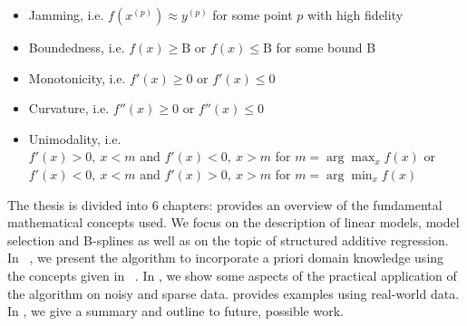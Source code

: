 \begin{itemize} \label{list:possible-constraints}
	\item Jamming, i.e. $f(x^{(p)}) \approx y^{(p)}$ for some point $p$ with high fidelity
	\item Boundedness, i.e. $f(x) \ge \mathrm{B}$ or $f(x) \le \mathrm{B}$ for some bound B
	\item Monotonicity, i.e. $f'(x) \ge 0$ or $f'(x) \le 0$
	\item Curvature, i.e. $f''(x) \ge 0$ or $f''(x) \le 0$
	\item Unimodality, i.e. \\ $f'(x) > 0, \ x < m$ and $f'(x) < 0, \ x > m$ for $m = \arg \max_{x} f(x)$ or \\ $f'(x) < 0, \ x < m$ and $f'(x) > 0, \ x > m$ for $m = \arg \min_{x} f(x)$
\end{itemize}
%
The thesis is divided into 6 chapters:  provides an overview of the fundamental mathematical concepts used. We focus on the description of linear models, model selection and B-splines as well as on the topic of structured additive regression. In ~, we present the algorithm to incorporate a priori domain knowledge using the concepts given in ~. In , we show some aspects of the practical application of the algorithm on noisy and sparse data.  provides examples using real-world data. In , we give a summary and outline to future, possible work. 
